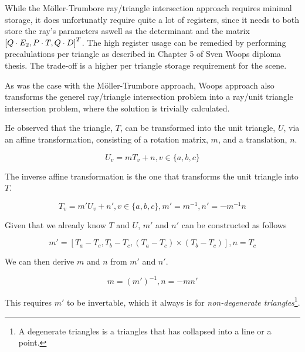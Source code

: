 
While the Möller-Trumbore ray/triangle intersection approach requires
minimal storage, it does unfortunatly require quite a lot of
registers, since it needs to both store the ray's parameters aswell as
the determinant and the matrix $\left[Q \cdot E_2, P \cdot T, Q
  \cdot D \right]^T$. The high register usage can be remedied by performing
precalulations per triangle as described in Chapter 5 of Sven Woops
diploma thesis. The trade-off is a higher per
triangle storage requirement for the scene.


As was the case with the Möller-Trumbore approach, Woops approach also
transforms the generel ray/triangle intersection problem into a
ray/unit triangle intersection problem, where the solution is
trivially calculated.

He observed that the triangle, $T$, can be transformed into the unit
triangle, $U$, via an affine transformation, consisting of a rotation
matrix, $m$, and a translation, $n$.

\begin{displaymath}
  U_v = m T_v + n, v \in \{a, b, c\}
\end{displaymath}

The inverse affine transformation is the one that transforms the unit
triangle into $T$.

\begin{displaymath}
  T_v = m' U_v + n', v \in \{a, b, c\}, m' = m^{-1}, n' = -m^{-1}n
\end{displaymath}

Given that we already know $T$ and $U$, $m'$ and $n'$ can be
constructed as follows

\begin{displaymath}
  m' = \left[ T_a - T_c, T_b - T_c, (T_a - T_c) \times (T_b - T_c)
    \right],
  n = T_c
\end{displaymath}

We can then derive $m$ and $n$ from $m'$ and $n'$. 

\begin{displaymath}
  m = (m')^{-1},
  n = - m n'
\end{displaymath}

This requires $m'$ to be invertable, which it always is for
\textit{non-degenerate triangles}\footnote{A degenerate triangles is
  a triangles that has collapsed into a line or a point.}.

